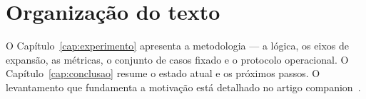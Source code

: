 \section{Organização do texto}

O Capítulo~\ref{cap:experimento} apresenta a metodologia --- a lógica,
os eixos de expansão, as métricas, o conjunto de casos fixado e o protocolo
operacional. O Capítulo~\ref{cap:conclusao} resume o estado atual e os próximos
passos. O levantamento que fundamenta a motivação está detalhado no artigo
companion~\cite{barreto2026survey}.

